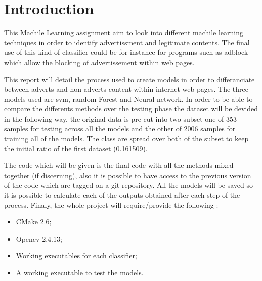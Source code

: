 \section{Introduction}

This Machile Learning assignment aim to look into different machile learning techniques in order to identify advertissment and legitimate contents. The final use of this kind of classifier could be for instance for programs such as adblock which allow the blocking of advertissement within web pages.

This report will detail the process used to create models in order to differanciate between adverts and non adverts content within internet web pages. The three models used are svm, random Forest and Neural network.
In order to be able to compare the differents methods over the testing phase the dataset will be devided in the following way, the original data is pre-cut into two subset one of 353 samples for testing across all the models and the other of 2006 samples for training all of the models. The class are spread over both of the subset to keep the initial ratio of the first dataset (0.161509).

The code which will be given is the final code with all the methods mixed together (if discerning), also it is possible to have access to the previous version of the code which are tagged on a git repository. All the models will be saved so it is possible to calculate each of the outputs obtained after each step of the process. Finaly, the whole project will require/provide the following :
\begin{itemize}
  \item CMake 2.6;
  \item Opencv 2.4.13;
  \item Working executables for each classifier;
  \item A working executable to test the models.
\end{itemize}
